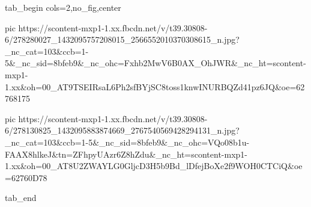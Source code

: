  
 
 
 
 


\ifcmt
  tab_begin cols=2,no_fig,center

     pic https://scontent-mxp1-1.xx.fbcdn.net/v/t39.30808-6/278280027_1432095757208015_2566552010370308615_n.jpg?_nc_cat=103&ccb=1-5&_nc_sid=8bfeb9&_nc_ohc=Fxhb2MwV6B0AX_OhJWR&_nc_ht=scontent-mxp1-1.xx&oh=00_AT9TSEIRsaL6Ph2sfBYjSC8toss1knwINURBQZd41pz6JQ&oe=62768175

     pic https://scontent-mxp1-1.xx.fbcdn.net/v/t39.30808-6/278130825_1432095883874669_2767540569428294131_n.jpg?_nc_cat=103&ccb=1-5&_nc_sid=8bfeb9&_nc_ohc=VQo08b1u-FAAX8hlkeJ&tn=ZFhpyUAzr6Z8hZdu&_nc_ht=scontent-mxp1-1.xx&oh=00_AT8U2ZWAYLG0GljcD3H5b9Bd_lDfejBoXe2f9WOH0CTCiQ&oe=62760D78

  tab_end
\fi
